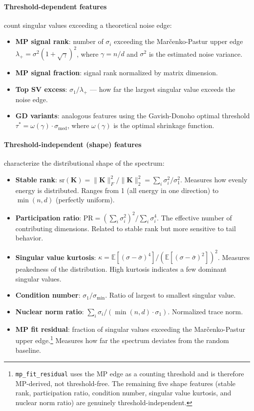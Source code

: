 \documentclass[11pt,a4paper]{article}
\begin{document}
\paragraph{Threshold-dependent features} count singular values
exceeding a theoretical noise edge:
\begin{itemize}
\item \textbf{MP signal rank}: number of $\sigma_i$ exceeding the
  Mar\v{c}enko-Pastur upper edge
  $\lambda_+ = \sigma^2(1 + \sqrt{\gamma})^2$, where $\gamma = n/d$
  and $\sigma^2$ is the estimated noise variance.
\item \textbf{MP signal fraction}: signal rank normalized by matrix
  dimension.
\item \textbf{Top SV excess}: $\sigma_1 / \lambda_+$ --- how far the
  largest singular value exceeds the noise edge.
\item \textbf{GD variants}: analogous features using the
  Gavish-Donoho optimal threshold
  $\tau^* = \omega(\gamma) \cdot \sigma_{\text{med}}$, where
  $\omega(\gamma)$ is the optimal shrinkage function.
\end{itemize}

\paragraph{Threshold-independent (shape) features} characterize the
distributional shape of the spectrum:
\begin{itemize}
\item \textbf{Stable rank}:
  $\text{sr}(\mathbf{K}) = \|\mathbf{K}\|_F^2 / \|\mathbf{K}\|_2^2 = \sum_i \sigma_i^2 / \sigma_1^2$.
  Measures how evenly energy is distributed. Ranges from 1 (all energy
  in one direction) to $\min(n,d)$ (perfectly uniform).
\item \textbf{Participation ratio}:
  $\text{PR} = (\sum_i \sigma_i^2)^2 / \sum_i \sigma_i^4$. The
  effective number of contributing dimensions. Related to stable rank
  but more sensitive to tail behavior.
\item \textbf{Singular value kurtosis}:
  $\kappa = \mathbb{E}[(\sigma - \bar{\sigma})^4] / (\mathbb{E}[(\sigma - \bar{\sigma})^2])^2$.
  Measures peakedness of the distribution. High kurtosis indicates a
  few dominant singular values.
\item \textbf{Condition number}: $\sigma_1 / \sigma_{\min}$. Ratio of
  largest to smallest singular value.
\item \textbf{Nuclear norm ratio}:
  $\sum_i \sigma_i / (\min(n,d) \cdot \sigma_1)$. Normalized trace
  norm.
\item \textbf{MP fit residual}: fraction of singular values exceeding
  the Mar\v{c}enko-Pastur upper edge.\footnote{\texttt{mp\_fit\_residual}
  uses the MP edge as a counting threshold and is therefore MP-derived,
  not threshold-free. The remaining five shape features (stable rank,
  participation ratio, condition number, singular value kurtosis, and
  nuclear norm ratio) are genuinely threshold-independent.}
  Measures how far the spectrum deviates from the random
  baseline.
\end{itemize}
\end{document}
